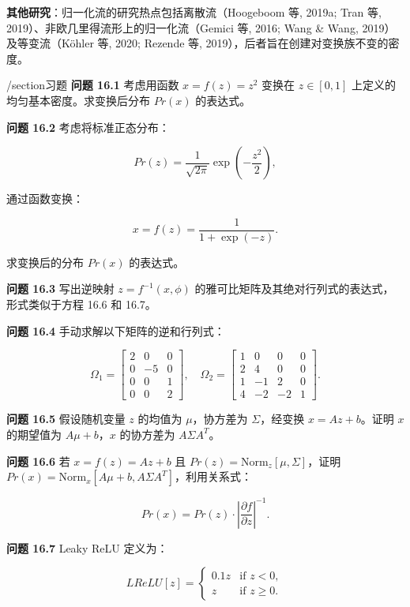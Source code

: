 \textbf{其他研究}：归一化流的研究热点包括离散流（Hoogeboom 等, 2019a; Tran 等, 2019）、非欧几里得流形上的归一化流（Gemici 等, 2016; Wang & Wang, 2019）及等变流（Köhler 等, 2020; Rezende 等, 2019），后者旨在创建对变换族不变的密度。

/section{习题}
\textbf{问题 16.1} 考虑用函数 \(x = f(z) = z^2\) 变换在 \(z \in [0, 1]\) 上定义的均匀基本密度。求变换后分布 \(Pr(x)\) 的表达式。

\textbf{问题 16.2} 考虑将标准正态分布：

\[
Pr(z) = \frac{1}{\sqrt{2\pi}} \exp\left(-\frac{z^2}{2}\right), \tag{16.27}
\]

通过函数变换：

\[
x = f(z) = \frac{1}{1 + \exp(-z)}. \tag{16.28}
\]

求变换后的分布 \(Pr(x)\) 的表达式。

\textbf{问题 16.3} 写出逆映射 \(z = f^{-1}(x, \phi)\) 的雅可比矩阵及其绝对行列式的表达式，形式类似于方程 16.6 和 16.7。

\textbf{问题 16.4} 手动求解以下矩阵的逆和行列式：

\[
\Omega_1 = \begin{bmatrix}
2 & 0 & 0 \\
0 & -5 & 0 \\
0 & 0 & 1 \\
0 & 0 & 2
\end{bmatrix}, \quad
\Omega_2 = \begin{bmatrix}
1 & 0 & 0 & 0\\
2 & 4 & 0 & 0\\
1 & -1 & 2 & 0\\
4 & -2 & -2 & 1
\end{bmatrix}. \tag{16.29}
\]

\textbf{问题 16.5} 假设随机变量 \(z\) 的均值为 \(\mu\)，协方差为 \(\Sigma\)，经变换 \(x = Az + b\)。证明 \(x\) 的期望值为 \(A\mu + b\)，\(x\) 的协方差为 \(A\Sigma A^T\)。

\textbf{问题 16.6} 若 \(x = f(z) = Az + b\) 且 \(Pr(z) = \text{Norm}_z[\mu, \Sigma]\)，证明 \(Pr(x) = \text{Norm}_x[A\mu + b, A\Sigma A^T]\)，利用关系式：

\[
Pr(x) = Pr(z) \cdot \left| \frac{\partial f}{\partial z} \right|^{-1}. \tag{16.30}
\]

\textbf{问题 16.7} Leaky ReLU 定义为：

\[
LReLU[z] = \begin{cases}
0.1z & \text{if } z < 0, \\
z & \text{if } z \geq 0.
\end{cases} \tag{16.31}
\]

